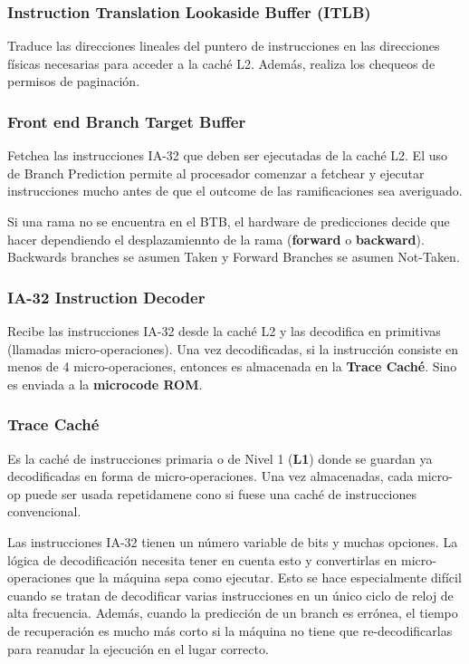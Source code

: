 \subsubsection*{Instruction Translation Lookaside Buffer (ITLB)}
Traduce las direcciones lineales del puntero de instrucciones en las direcciones físicas necesarias para acceder a la caché L2. Además, realiza los chequeos de permisos de paginación.

\subsubsection*{Front end Branch Target Buffer}\label{sec::Intel::Netburst::frontEnd::btb}
Fetchea las instrucciones IA-32 que deben ser ejecutadas de la caché L2. El uso de Branch Prediction permite al procesador comenzar a fetchear y ejecutar instrucciones mucho antes de que el outcome de las ramificaciones sea averiguado.
	
Si una rama no se encuentra en el BTB, el hardware de predicciones decide que hacer dependiendo el desplazamiennto de la rama (\textbf{forward} o \textbf{backward}). Backwards branches se asumen Taken y Forward Branches se asumen Not-Taken.

\subsubsection*{IA-32 Instruction Decoder}
Recibe las instrucciones IA-32 desde la caché L2 y las decodifica en primitivas (llamadas micro-operaciones). Una vez decodificadas, si la instrucción consiste en menos de 4 micro-operaciones, entonces es almacenada en la \textbf{Trace Caché}. Sino es enviada a la \textbf{microcode ROM}.

\subsubsection*{Trace Caché} 
Es la caché de instrucciones primaria o de Nivel 1 (\textbf{L1}) donde se guardan ya decodificadas en forma de micro-operaciones. Una vez almacenadas, cada micro-op puede ser usada repetidamene cono si fuese una caché de instrucciones convencional.

Las instrucciones IA-32 tienen un número variable de bits y muchas opciones. La lógica de decodificación necesita tener en cuenta esto y convertirlas en micro-operaciones que la máquina sepa como ejecutar. Esto se hace especialmente difícil cuando se tratan de decodificar varias instrucciones en un único ciclo de reloj de alta frecuencia. Además, cuando la predicción de un branch es errónea, el tiempo de recuperación es mucho más corto si la máquina no tiene que re-decodificarlas para reanudar la ejecución en el lugar correcto.
	

